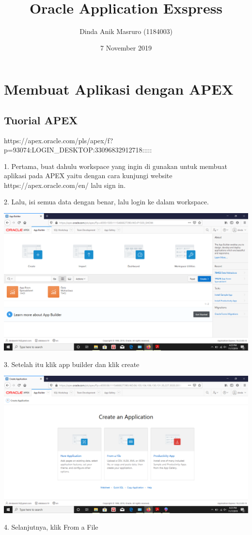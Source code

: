 \documentclass{article}
\title{Oracle Application Exspress}
\author{Dinda Anik Masruro (1184003)}
\date{7 November 2019}
\begin{document}
\maketitle

\section{Membuat Aplikasi dengan APEX}
\subsection{Tuorial APEX}
\item https://apex.oracle.com/pls/apex/f?p=93074:LOGIN_DESKTOP:33096832912718:::::
\item 1. Pertama, buat dahulu workspace yang ingin di gunakan untuk membuat aplikasi pada APEX yaitu dengan cara kunjungi website https://apex.oracle.com/en/ lalu sign in.
\item 2. Lalu, isi semua data dengan benar, lalu login ke dalam workspace.
\begin{center}
    \includegraphics[width=10cm\textwidth]{gambar/1.png}
\end{center}
\newpage
\item 3. Setelah itu klik app builder dan klik create
\begin{center}
 \includegraphics[width=10cm\textwidth]{gambar/2.png}
\end{center}
\item 4. Selanjutnya, klik From a File
\end{document}
